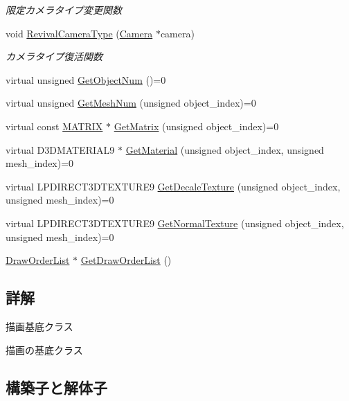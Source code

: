 \begin{DoxyCompactItemize}
\begin{DoxyCompactList}\small\item\em 限定カメラタイプ変更関数 \end{DoxyCompactList}\item 
void \mbox{\hyperlink{class_draw_base_a48b144e61928b7658c7a849017e40c79}{Revival\+Camera\+Type}} (\mbox{\hyperlink{class_camera}{Camera}} $\ast$camera)
\begin{DoxyCompactList}\small\item\em カメラタイプ復活関数 \end{DoxyCompactList}\item 
virtual unsigned \mbox{\hyperlink{class_draw_base_aed79e9db49de4fa2dff064495b877bcd}{Get\+Object\+Num}} ()=0
\item 
virtual unsigned \mbox{\hyperlink{class_draw_base_a194eb48924f205d60d4e63c5becdd2fe}{Get\+Mesh\+Num}} (unsigned object\+\_\+index)=0
\item 
virtual const \mbox{\hyperlink{_vector3_d_8h_a032295cd9fb1b711757c90667278e744}{M\+A\+T\+R\+IX}} $\ast$ \mbox{\hyperlink{class_draw_base_a01239bf362040f7f2ef5e5f5371dcf18}{Get\+Matrix}} (unsigned object\+\_\+index)=0
\item 
virtual D3\+D\+M\+A\+T\+E\+R\+I\+A\+L9 $\ast$ \mbox{\hyperlink{class_draw_base_ad82a75dff8e4e2f2ebbec2dd0d0734e5}{Get\+Material}} (unsigned object\+\_\+index, unsigned mesh\+\_\+index)=0
\item 
virtual L\+P\+D\+I\+R\+E\+C\+T3\+D\+T\+E\+X\+T\+U\+R\+E9 \mbox{\hyperlink{class_draw_base_a4e36184dbb605bcae13bfb38722ddc24}{Get\+Decale\+Texture}} (unsigned object\+\_\+index, unsigned mesh\+\_\+index)=0
\item 
virtual L\+P\+D\+I\+R\+E\+C\+T3\+D\+T\+E\+X\+T\+U\+R\+E9 \mbox{\hyperlink{class_draw_base_a87bb54e7f422959e84ac00aa7631bd3b}{Get\+Normal\+Texture}} (unsigned object\+\_\+index, unsigned mesh\+\_\+index)=0
\item 
\mbox{\hyperlink{class_draw_order_list}{Draw\+Order\+List}} $\ast$ \mbox{\hyperlink{class_draw_base_a894bf875b80745150b250e584f00fa0c}{Get\+Draw\+Order\+List}} ()
\end{DoxyCompactItemize}


\subsection{詳解}
描画基底クラス 

描画の基底クラス 

\subsection{構築子と解体子}
\mbox{\label{class_draw_base_a799597f696c5cbf6074fb2655dea5e18}} 
